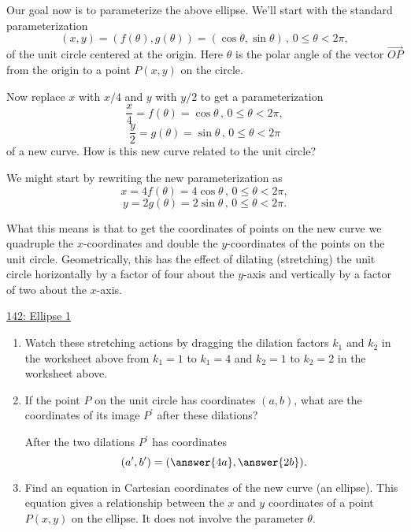 \documentclass{ximera}
\begin{document}
\begin{example} \label{Ex:DFDrefdfobbzx}
Our goal now is to parameterize the above ellipse. We'll start with the standard parameterization 
\[
    (x,y) = (f(\theta) , g(\theta)) =   ( \cos \theta , \sin \theta ) \, , \, 0\leq\theta < 2\pi ,
\]
of the unit circle centered at the origin. Here $\theta$ is the polar angle of the vector $\overrightarrow{OP}$ from the origin to a point $P(x,y)$ on the circle.

Now replace $x$ with $x/4$ and $y$ with $y/2$ to get a parameterization
\[
  \frac{x}{4} = f(\theta) = \cos\theta \, , \, 0\leq\theta < 2\pi ,
\]
\[
  \frac{y}{2} = g(\theta) = \sin \theta \, , \, 0\leq\theta < 2\pi 
\]
of a new curve. How is this new curve related to the unit circle?

We might start by rewriting the new parameterization as
\[
      x = 4 f(\theta) = 4\cos\theta \, , \, 0\leq\theta < 2\pi ,
\]
\[ 
   y = 2 g(\theta) = 2\sin \theta \, , \, 0\leq\theta < 2\pi .
\]

What this means is that to get the coordinates of points on the new curve we quadruple the $x$-coordinates and double the $y$-coordinates of the points on the unit circle. Geometrically, this has the effect of dilating (stretching) the unit circle horizontally by a factor of four about the $y$-axis and vertically by a factor of two about the $x$-axis. 


\begin{onlineOnly}
    \begin{center}
\end{center}
\end{onlineOnly}

\href{https://www.desmos.com/calculator/3ibj708prx}{142: Ellipse 1}

\begin{enumerate}
\item Watch these stretching actions by dragging the dilation factors $k_1$ and $k_2$ in the worksheet above from $k_1=1$ to $k_1=4$ and $k_2=1$ to $k_2 = 2$ in the worksheet above.

\item If the point $P$ on the unit circle has coordinates $(a,b)$, what are the coordinates of its image $P^\prime$ after these dilations?

After the two dilations $P^\prime$ has coordinates
\[
    (a^\prime, b^\prime) = (  \answer{4a} , \answer{2b} ) .
\]

\item Find an equation in Cartesian coordinates of the new curve (an ellipse). This equation gives a relationship between the $x$ and $y$ coordinates of a point $P(x,y)$ on the ellipse. It does not involve the parameter $\theta$.


\end{enumerate}
\end{example}
\end{document}
